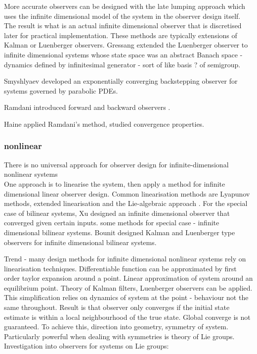 More accurate observers can be designed with the late lumping approach which uses the infinite dimensional model of the system in the observer design itself. The result is what is an actual infinite dimensional observer that is discretised later for practical implementation. These methods are typically extensions of Kalman or Luenberger observers. 
Gressang \cite{gressang1975observers} extended the Luenberger observer to infinite dimensional systems whose state space was an abstract Banach space - dynamics defined by infinitesimal generator - sort of like basis ? of semigroup.

Smyshlyaev \cite{smyshlyaev2005backstepping} developed an exponentially converging backstepping observer for systems governed by parabolic PDEs.

Ramdani introduced forward and backward observers \cite{ramdani2010recovering}.

Haine \cite{haine2014recovering} applied Ramdani's method, studied convergence properties.

\subsubsection{nonlinear}
There is no universal approach for observer design for infinite-dimensional nonlinear systems\\
One approach is to linearise the system, then apply a method for infinite dimensional linear observer design. Common linearisation methods are Lyapunov methods, extended linearisation and the Lie-algebraic approach \cite{primbs1996survey}.
For the special case of bilinear systems, Xu \cite{xu1995observer} designed an infinite dimensional observer that converged given certain inputs. some methods for special case - infinite dimensional bilinear systems. Bounit \cite{bounit1997observers} designed Kalman and Luenberger type observers for infinite dimensional bilinear systems. 

Trend - many design methods for infinite dimensional nonlinear systems rely on linearisation techniques. Differentiable function can be approximated by first order taylor expansion around a point. Linear approximation of system around an equilibrium point. Theory of Kalman filters, Luenberger observers can be applied. This simplification relies on dynamics of system at the point -  behaviour not the same throughout. Result is that observer only converges if the initial state estimate is within a local neighbourhood of the true state. Global converge is not guaranteed. 
To achieve this, direction into geometry, symmetry of system. Particularly powerful when dealing with symmetries is theory of Lie groups.
Investigation into observers for systems on Lie groups:

